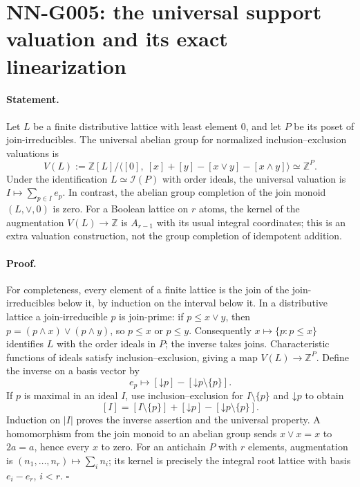 \section{NN-G005: the universal support valuation and its exact linearization}
\paragraph{Statement.}
Let $L$ be a finite distributive lattice with least element $0$,
and let $P$ be its poset of join-irreducibles. The universal abelian
group for normalized inclusion--exclusion valuations is
\[
 V(L):=\mathbb Z[L]/\langle[0],\ [x]+[y]-[x\vee y]-[x\wedge y]\rangle
 \simeq\mathbb Z^P.                                      \tag{G005.1}
\]
Under the identification $L\simeq\mathcal I(P)$ with order ideals,
the universal valuation is $I\mapsto\sum_{p\in I}e_p$.
In contrast, the abelian group completion of the join monoid
$(L,\vee,0)$ is zero. For a Boolean lattice on $r$ atoms,
the kernel of the augmentation $V(L)\to\mathbb Z$ is $A_{r-1}$
with its usual integral coordinates; this is an extra valuation
construction, not the group completion of idempotent addition.

\paragraph{Proof.}
For completeness, every element of a finite lattice is the join
of the join-irreducibles below it, by induction on the interval
below it. In a distributive lattice a join-irreducible $p$ is
join-prime: if $p\le x\vee y$, then
$p=(p\wedge x)\vee(p\wedge y)$, so $p\le x$ or $p\le y$.
Consequently $x\mapsto\{p:p\le x\}$ identifies $L$ with the
order ideals in $P$; the inverse takes joins. Characteristic
functions of ideals satisfy inclusion--exclusion, giving a map
$V(L)\to\mathbb Z^P$. Define the inverse on a basis vector by
\[
 e_p\longmapsto[\mathord\downarrow p]
                    -[\mathord\downarrow p\setminus\{p\}].
\]
If $p$ is maximal in an ideal $I$, use inclusion--exclusion for
$I\setminus\{p\}$ and $\mathord\downarrow p$ to obtain
\[
 [I]=[I\setminus\{p\}]+[\mathord\downarrow p]
              -[\mathord\downarrow p\setminus\{p\}].
\]
Induction on $|I|$ proves the inverse assertion and the universal
property. A homomorphism from the join monoid to an abelian group
sends $x\vee x=x$ to $2a=a$, hence every $x$ to zero.
For an antichain $P$ with $r$ elements, augmentation is
$(n_1,\ldots,n_r)\mapsto\sum_i n_i$; its kernel is precisely the
integral root lattice with basis $e_i-e_r$, $i<r$.
\hfill$\square$

